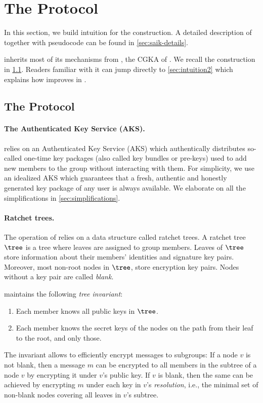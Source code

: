 \section{The \saik Protocol}\label{sec:intuition}
In this section, we build intuition for the \saik construction. A detailed description of \saik together with pseudocode can be found in \cref{sec:saik-details}.

\saik inherits most of its mechanisms from \protITK, the CGKA of \mls. We recall the \protITK construction in \cref{sec:intuition1}. Readers familiar with it can jump directly to \cref{sec:intuition2} which explains how \saik improves in \protITK.

\subsection{The \protITK Protocol}\label{sec:intuition1}
\paragraph{The Authenticated Key Service (AKS).}
\protITK relies on an Authenticated Key Service (AKS) which authentically distributes so-called one-time key packages (also called key bundles or pre-keys) used to add new members to the group without interacting with them. For simplicity, we use an idealized AKS which guarantees that a fresh, authentic and honestly generated key package of any user is always available. We elaborate on all the simplifications in \cref{sec:simplifications}.

\paragraph{Ratchet trees.}
The operation of \protITK relies on a data structure called ratchet trees. A ratchet tree $\tree$ is a tree where leaves are assigned to group members. Leaves of $\tree$ store information about their members' identities and signature key pairs. Moreover, most non-root nodes in $\tree$, store encryption key pairs. Nodes without a key pair are called \emph{blank}.

\protITK maintains the following \emph{tree invariant}:
\begin{enumerate}[itemsep=0pt]
  \item Each member knows all public keys in $\tree$.
  \item Each member knows the secret keys of the nodes on the path from their leaf to the root, and only those.
\end{enumerate}
The invariant allows to efficiently encrypt messages to subgroups: If a node $v$ is not blank, then a message $m$ can be encrypted to all members in the subtree of a node $v$ by encrypting it under $v$'s public key. If $v$ is blank, then the same can be achieved by encrypting $m$ under each key in $v$'s \emph{resolution}, i.e., the minimal set of non-blank nodes covering all leaves in $v$'s subtree.

